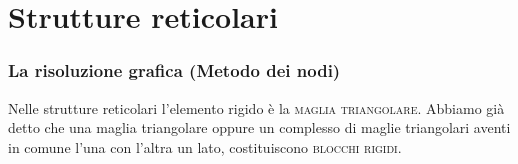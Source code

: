 \clearpage
\pagestyle{fancy}
\part{Strutture reticolari}
\setcounter{section}{0}
\section{La risoluzione grafica (Metodo dei nodi)}
\noindent Nelle strutture reticolari l'elemento rigido è la \textsc{maglia triangolare}. Abbiamo già detto che una maglia triangolare oppure un complesso di maglie triangolari aventi in comune l'una con l'altra un lato, costituiscono \textsc{blocchi rigidi}. 

